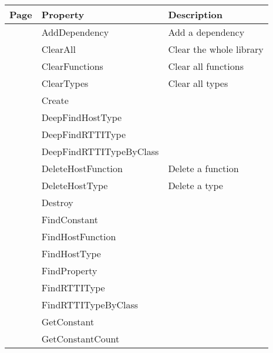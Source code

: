 \begin{tabularx}{\textwidth}{llX}
Page & Property & Description  \\ \hline
\pageref{thoriumcorepkg:thorium:tthoriumlibrary:adddependency} & AddDependency  & Add a dependency \\
\pageref{thoriumcorepkg:thorium:tthoriumlibrary:clearall} & ClearAll  & Clear the whole library \\
\pageref{thoriumcorepkg:thorium:tthoriumlibrary:clearfunctions} & ClearFunctions  & Clear all functions \\
\pageref{thoriumcorepkg:thorium:tthoriumlibrary:cleartypes} & ClearTypes  & Clear all types \\
\pageref{thoriumcorepkg:thorium:tthoriumlibrary:create} & Create  &  \\
\pageref{thoriumcorepkg:thorium:tthoriumlibrary:deepfindhosttype} & DeepFindHostType  &  \\
\pageref{thoriumcorepkg:thorium:tthoriumlibrary:deepfindrttitype} & DeepFindRTTIType  &  \\
\pageref{thoriumcorepkg:thorium:tthoriumlibrary:deepfindrttitypebyclass} & DeepFindRTTITypeByClass  &  \\
\pageref{thoriumcorepkg:thorium:tthoriumlibrary:deletehostfunction} & DeleteHostFunction  & Delete a function \\
\pageref{thoriumcorepkg:thorium:tthoriumlibrary:deletehosttype} & DeleteHostType  & Delete a type \\
\pageref{thoriumcorepkg:thorium:tthoriumlibrary:destroy} & Destroy  &  \\
\pageref{thoriumcorepkg:thorium:tthoriumlibrary:findconstant} & FindConstant  &  \\
\pageref{thoriumcorepkg:thorium:tthoriumlibrary:findhostfunction} & FindHostFunction  &  \\
\pageref{thoriumcorepkg:thorium:tthoriumlibrary:findhosttype} & FindHostType  &  \\
\pageref{thoriumcorepkg:thorium:tthoriumlibrary:findproperty} & FindProperty  &  \\
\pageref{thoriumcorepkg:thorium:tthoriumlibrary:findrttitype} & FindRTTIType  &  \\
\pageref{thoriumcorepkg:thorium:tthoriumlibrary:findrttitypebyclass} & FindRTTITypeByClass  &  \\
\pageref{thoriumcorepkg:thorium:tthoriumlibrary:getconstant} & GetConstant  &  \\
\pageref{thoriumcorepkg:thorium:tthoriumlibrary:getconstantcount} & GetConstantCount  &  \\

\end{tabularx}
